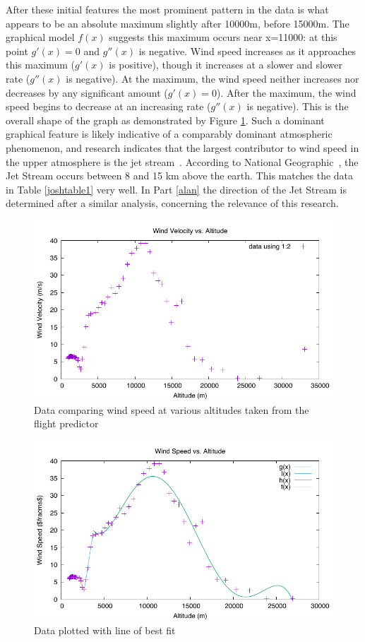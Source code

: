 \documentclass{article}
\begin{document}
After these initial features the most prominent pattern in the data is what appears to be an absolute maximum slightly after 10000\si{m}, before 15000\si{m}.  The graphical model $f(x)$ suggests this maximum occurs near x=11000: at this point $g'(x) = 0$ and $g''(x)$ is negative.  Wind speed increases as it approaches this maximum ($g'(x)$ is positive), though it increases at a slower and slower rate ($g''(x)$ is negative). At the maximum, the wind speed neither increases nor decreases by any significant amount ($g'(x)=0$).  After the maximum, the wind speed begins to decrease at an increasing rate ($g''(x)$ is negative).  This is the overall shape of the graph as demonstrated by Figure \ref{josh1}.  Such a dominant graphical feature is likely indicative of a comparably dominant atmospheric phenomenon, and research indicates that the largest contributor to wind speed in the upper atmosphere is the jet stream~\cite{National-Geographic}.  According to National Geographic~\cite{National-Geographic}, the Jet Stream occurs between 8 and 15 \si{km} above the earth.  This matches the data in Table \ref{joshtable1} very well.  In Part \ref{alan} the direction of the Jet Stream is determined after a similar analysis, concerning the relevance of this research.


\begin{figure}
\centering
\includegraphics{josh-data/figure1.pdf}
\caption{Data comparing wind speed at various altitudes taken from the flight predictor}
\label{josh1}
\end{figure}

\begin{figure}
\centering
\includegraphics{josh-data/figure2.pdf}
\caption{Data plotted with line of best fit}
\label{josh2}
\end{figure}
\end{document}
